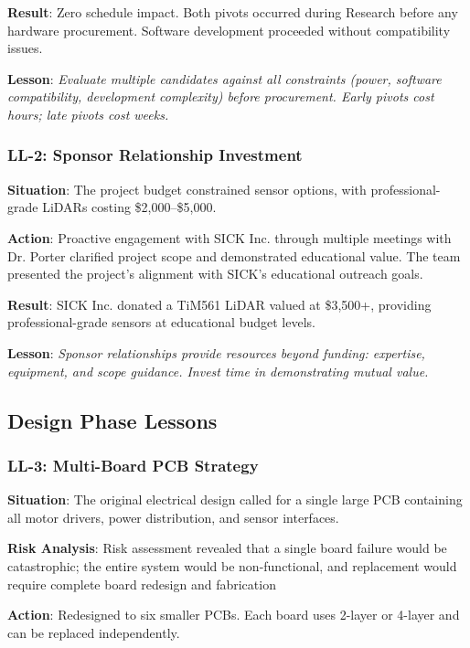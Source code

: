 \textbf{Result}: Zero schedule impact. Both pivots occurred during Research before any hardware procurement. Software development proceeded without compatibility issues.

\textbf{Lesson}: \textit{Evaluate multiple candidates against all constraints (power, software compatibility, development complexity) before procurement. Early pivots cost hours; late pivots cost weeks.}

\subsubsection{LL-2: Sponsor Relationship Investment}

\textbf{Situation}: The project budget constrained sensor options, with professional-grade LiDARs costing \$2,000--\$5,000.

\textbf{Action}: Proactive engagement with SICK Inc. through multiple meetings with Dr. Porter clarified project scope and demonstrated educational value. The team presented the project's alignment with SICK's educational outreach goals.

\textbf{Result}: SICK Inc. donated a TiM561 LiDAR valued at \$3,500+, providing professional-grade sensors at educational budget levels.

\textbf{Lesson}: \textit{Sponsor relationships provide resources beyond funding: expertise, equipment, and scope guidance. Invest time in demonstrating mutual value.}

\subsection{Design Phase Lessons}

\subsubsection{LL-3: Multi-Board PCB Strategy}

\textbf{Situation}: The original electrical design called for a single large PCB containing all motor drivers, power distribution, and sensor interfaces.

\textbf{Risk Analysis}: Risk assessment revealed that a single board failure would be catastrophic; the entire system would be non-functional, and replacement would require complete board redesign and fabrication

\textbf{Action}: Redesigned to six smaller PCBs. Each board uses 2-layer or 4-layer and can be replaced independently.

